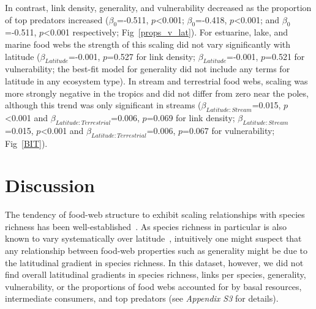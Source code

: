 \documentclass[12pt]{article}
\begin{document}
\begin{spacing}{1.0}
  In contrast, link density, generality, and vulnerability decreased as the
  proportion of top predators increased ($\beta_0$=-0.511, $p$\textless0.001;
  $\beta_0$=-0.418, $p$\textless0.001; and $\beta_0$=-0.511, $p$\textless0.001
  respectively; Fig~\ref{props_v_lat}). For estuarine, lake, and marine
  food webs the strength of this scaling did not
  vary significantly with latitude ($\beta_{Latitude}$=-0.001, $p$=0.527 for
  link density; $\beta_{Latitude}$=-0.001, $p$=0.521 for vulnerability; the
  best-fit model for generality did not include any terms for latitude in
  any ecosystem type). In stream and terrestrial food webs, scaling was more
  strongly negative in the tropics and did not differ from zero near the poles,
  although this trend was only significant in streams
  ($\beta_{Latitude:Stream}$=0.015, $p$\textless0.001 and
  $\beta_{Latitude:Terrestrial}$=0.006, $p$=0.069 for link density;
  $\beta_{Latitude:Stream}$=0.015, $p$\textless0.001 and
  $\beta_{Latitude:Terrestrial}$=0.006, $p$=0.067 for vulnerability; Fig~\ref{BIT}).



\section*{Discussion}

  The tendency of food-web structure to exhibit scaling relationships with
  species richness has been well-established~\citep{Dunne2004,Riede2010}. As
  species richness in particular is also known to vary systematically over
  latitude~\citep{Schemske2009,Macpherson2002,Kaufman1995}, intuitively one
  might suspect that any relationship between food-web properties such as
  generality might be due to the latitudinal gradient in species richness. In
  this dataset, however, we did not find overall latitudinal gradients in
  species richness, links per species,  generality, vulnerability, or the
  proportions of food webs accounted for by  basal resources, intermediate
  consumers, and top predators (see \emph{Appendix S3} for details).



\end{spacing}
\end{document}

